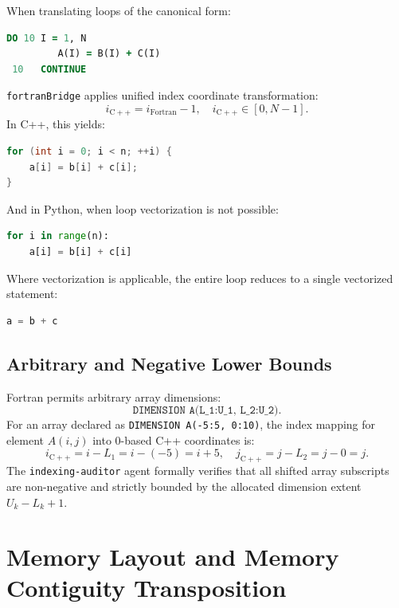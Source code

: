 \documentclass[11pt,a4paper]{article}
\theoremstyle{definition}
\begin{document}
When translating loops of the canonical form:
\begin{lstlisting}[language=Fortran]
      DO 10 I = 1, N
         A(I) = B(I) + C(I)
 10   CONTINUE
\end{lstlisting}
\texttt{fortranBridge} applies unified index coordinate transformation:
\begin{equation}
    i_{\mathrm{C++}} = i_{\mathrm{Fortran}} - 1, \quad i_{\mathrm{C++}} \in [0, N-1].
\end{equation}
In C++, this yields:
\begin{lstlisting}[language=C++]
for (int i = 0; i < n; ++i) {
    a[i] = b[i] + c[i];
}
\end{lstlisting}
And in Python, when loop vectorization is not possible:
\begin{lstlisting}[language=Python]
for i in range(n):
    a[i] = b[i] + c[i]
\end{lstlisting}
Where vectorization is applicable, the entire loop reduces to a single vectorized statement:
\begin{lstlisting}[language=Python]
a = b + c
\end{lstlisting}

\subsection{Arbitrary and Negative Lower Bounds}
Fortran permits arbitrary array dimensions:
\begin{equation}
    \texttt{DIMENSION A(L\_1:U\_1, L\_2:U\_2)}.
\end{equation}
For an array declared as \texttt{DIMENSION A(-5:5, 0:10)}, the index mapping for element $A(i, j)$ into 0-based C++ coordinates is:
\begin{equation}
    i_{\mathrm{C++}} = i - L_1 = i - (-5) = i + 5, \quad j_{\mathrm{C++}} = j - L_2 = j - 0 = j.
\end{equation}
The \texttt{indexing-auditor} agent formally verifies that all shifted array subscripts are non-negative and strictly bounded by the allocated dimension extent $U_k - L_k + 1$.

\section{Memory Layout and Memory Contiguity Transposition}
\end{document}
